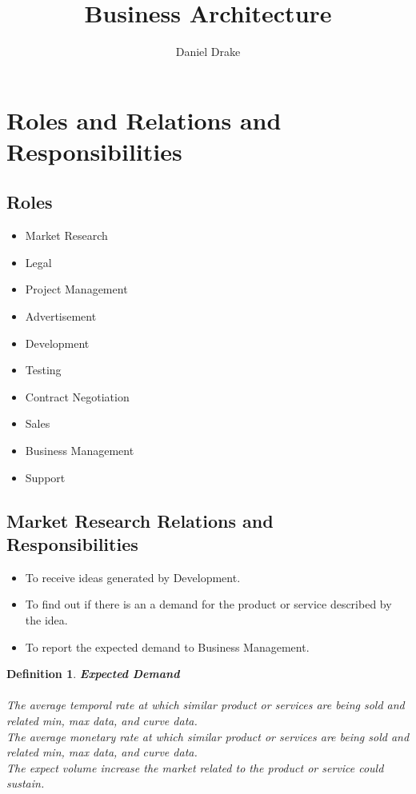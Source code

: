 \documentclass[12pt]{extarticle}
\title{Business Architecture}
\author{Daniel Drake}
\theoremstyle{plain}
\theoremstyle{plain}
\theoremstyle{plain}
\theoremstyle{Definition}
\newtheorem{def.}{Definition}[section]
\theoremstyle{Definition}
\theoremstyle{Definition}
\theoremstyle{plain}
\theoremstyle{plain}
\begin{document}
	\maketitle
	
	\section{Roles and Relations and Responsibilities}

	\subsection{Roles}

	\begin{itemize}
		\item Market Research
		\item Legal
		\item Project Management
		\item Advertisement 
		\item Development 
		\item Testing
		\item Contract Negotiation 
		\item Sales
		\item Business Management	
		\item Support
	\end{itemize}
	
	\subsection{Market Research Relations and Responsibilities}
		\begin{itemize}
			\item To receive ideas generated by Development.
			\item To find out if there is an a demand for the product or service described by the idea. 
			\item To report the expected demand to Business Management.
		\end{itemize}
		\begin{def.} \textbf{Expected Demand} \\ \\
			The average temporal rate at which similar product or services are being sold and related min, max data, and curve data. \\
			The average monetary rate at which similar product or services are being sold and related min, max data, and curve data. \\
			The expect volume increase the market related to the product or service could sustain. \\
		\end{def.}
\end{document}
